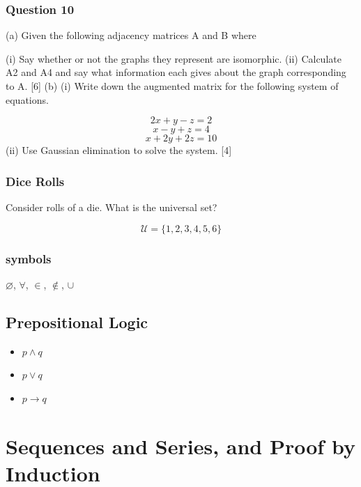 \documentclass[]{report}
\begin{document}
\begin{enumerate}
\subsection*{Question 10}

(a) Given the following adjacency matrices A and B where
%
%
%



(i) Say whether or not the graphs they represent are isomorphic.
(ii) Calculate A2 and A4 and say what information each gives about the graph
corresponding to A. [6]
(b) (i) Write down the augmented matrix for the following system of equations.

\[2x + y - z = 2\]
\[x - y + z = 4\]
\[x + 2y + 2z = 10\]
(ii) Use Gaussian elimination to solve the system. [4]



\subsection*{Dice Rolls}
Consider rolls of a die. What is the universal set?

\[ \mathcal{U} = \{1,2,3,4,5,6\} \]


\subsection*{symbols}
$\varnothing$,
$\forall$,
$\in$,
$\notin$,
$\cup$
\newpage

\section*{Prepositional Logic}


\begin{itemize}
\item $p \wedge q$
\item $p \vee q$
\item $p \rightarrow q$
\end{itemize}
\newpage
\chapter{Sequences and Series, and Proof by Induction}

\end{enumerate}
\end{document}
